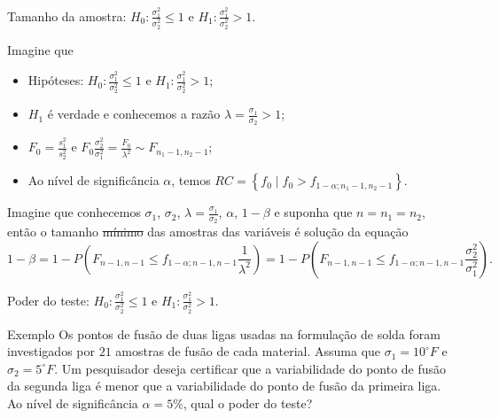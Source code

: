 \documentclass[9pt]{beamer}
\begin{document}
\begin{frame}{Tamanho da amostra: $H_0:\frac{\sigma_1^2}{\sigma_2^2} \leq 1$ e $H_1:\frac{\sigma_1^2}{\sigma_2^2} > 1$.}

Imagine que
\begin{itemize}
\item Hipóteses: $H_0:\frac{\sigma_1^2}{\sigma_2^2} \leq 1$ e $H_1:\frac{\sigma_1^2}{\sigma_2^2} > 1$;
\item $H_1$ é verdade e conhecemos a razão $\lambda=\frac{\sigma_1}{\sigma_2} > 1$;
\item $F_0 = \frac{s_1^2}{s_2^2}$ e $F_0 \frac{\sigma_2^2}{\sigma_1^2} = \frac{F_0}{\lambda^2} \sim F_{n_1-1, n_2-1}$;
\item Ao nível de significância $\alpha$, temos $RC = \left\{ f_0 \mid f_0 > f_{1-\alpha; n_1-1, n_2-1}  \right\}$.
\end{itemize}
\vfill


Imagine que conhecemos $\sigma_1$, $\sigma_2$, $\lambda = \frac{\sigma_1}{\sigma_2}$, $\alpha$, $1-\beta$ e suponha que $n=n_1=n_2$, então o tamanho \sout{mínimo} das amostras das variáveis é solução da equação
$$1-\beta=1 - P \left(F_{n-1, n-1} \leq f_{1-\alpha; n-1, n-1} \frac{1}{\lambda^2} \right) = 1 - P \left(F_{n-1, n-1} \leq f_{1-\alpha; n-1, n-1} \frac{\sigma_2^2}{\sigma_1^2} \right).$$
\end{frame}

\begin{frame}{Poder do teste: $H_0:\frac{\sigma_1^2}{\sigma_2^2} \leq 1$ e $H_1:\frac{\sigma_1^2}{\sigma_2^2} > 1$.}

\large
\begin{block}{Exemplo}
	Os pontos de fusão de duas ligas usadas na formulação de solda foram investigados por $21$ amostras de fusão de cada material. Assuma que $\sigma_1=10^\circ F$ e $\sigma_2=5^\circ F$. Um pesquisador deseja certificar que a variabilidade do ponto de fusão da segunda liga é menor que a variabilidade do ponto de fusão da primeira liga. Ao nível de significância $\alpha=5\%$, qual o poder do teste?
\end{block}

\normalsize
\end{frame}
\end{document}
